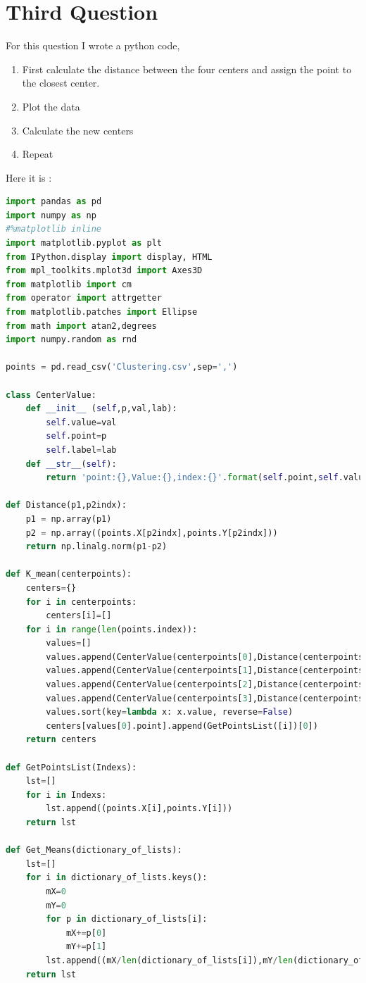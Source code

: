 \documentclass{article}
\begin{document}
\section*{Third Question}
For this question I wrote a python code,
\begin{enumerate}
\item  First calculate the distance between the four centers and assign the point to the closest center.
\item Plot the data
\item Calculate the new centers 
\item Repeat
\end{enumerate} Here it is : 
\begin{lstlisting}[language=Python]
import pandas as pd
import numpy as np
#%matplotlib inline
import matplotlib.pyplot as plt
from IPython.display import display, HTML
from mpl_toolkits.mplot3d import Axes3D
from matplotlib import cm
from operator import attrgetter
from matplotlib.patches import Ellipse
from math import atan2,degrees
import numpy.random as rnd

points = pd.read_csv('Clustering.csv',sep=',')

class CenterValue:
    def __init__ (self,p,val,lab):
        self.value=val
        self.point=p
        self.label=lab
    def __str__(self):
        return 'point:{},Value:{},index:{}'.format(self.point,self.value,self.label)

def Distance(p1,p2indx):
    p1 = np.array(p1)
    p2 = np.array((points.X[p2indx],points.Y[p2indx]))
    return np.linalg.norm(p1-p2)

def K_mean(centerpoints):
    centers={}
    for i in centerpoints:
        centers[i]=[]
    for i in range(len(points.index)):
        values=[]
        values.append(CenterValue(centerpoints[0],Distance(centerpoints[0],i),i))
        values.append(CenterValue(centerpoints[1],Distance(centerpoints[1],i),i))
        values.append(CenterValue(centerpoints[2],Distance(centerpoints[2],i),i))
        values.append(CenterValue(centerpoints[3],Distance(centerpoints[3],i),i))
        values.sort(key=lambda x: x.value, reverse=False)
        centers[values[0].point].append(GetPointsList([i])[0])
    return centers     

def GetPointsList(Indexs):
    lst=[]
    for i in Indexs:
        lst.append((points.X[i],points.Y[i]))
    return lst

def Get_Means(dictionary_of_lists):
    lst=[]
    for i in dictionary_of_lists.keys():
        mX=0
        mY=0
        for p in dictionary_of_lists[i]:
            mX+=p[0]
            mY+=p[1]
        lst.append((mX/len(dictionary_of_lists[i]),mY/len(dictionary_of_lists[i])))
    return lst


\end{lstlisting}
\end{document}
